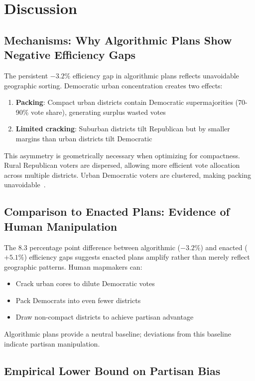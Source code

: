 \section{Discussion}

\subsection{Mechanisms: Why Algorithmic Plans Show Negative Efficiency Gaps}

The persistent $-3.2\%$ efficiency gap in algorithmic plans reflects unavoidable geographic sorting. Democratic urban concentration creates two effects:
\begin{enumerate}
\item \textbf{Packing}: Compact urban districts contain Democratic supermajorities (70-90\% vote share), generating surplus wasted votes
\item \textbf{Limited cracking}: Suburban districts tilt Republican but by smaller margins than urban districts tilt Democratic
\end{enumerate}

This asymmetry is geometrically necessary when optimizing for compactness. Rural Republican voters are dispersed, allowing more efficient vote allocation across multiple districts. Urban Democratic voters are clustered, making packing unavoidable~\cite{rodden2019cities}.

\subsection{Comparison to Enacted Plans: Evidence of Human Manipulation}

The 8.3 percentage point difference between algorithmic ($-3.2\%$) and enacted ($+5.1\%$) efficiency gaps suggests enacted plans amplify rather than merely reflect geographic patterns. Human mapmakers can:
\begin{itemize}
\item Crack urban cores to dilute Democratic votes
\item Pack Democrats into even fewer districts
\item Draw non-compact districts to achieve partisan advantage
\end{itemize}

Algorithmic plans provide a neutral baseline; deviations from this baseline indicate partisan manipulation.

\subsection{Empirical Lower Bound on Partisan Bias}

